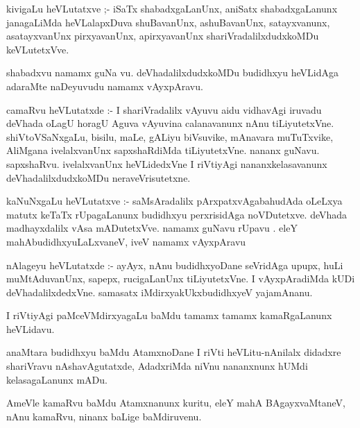 \documentclass{article}
\begin{document}
\begin{mn}
kivigaLu heVLutatxve ;- iSaTx shabadxgaLanUnx, aniSatx shabadxgaLanunx 
janagaLiMda heVLalapxDuva shuBavanUnx, ashuBavanUnx, satayxvanunx, asatayxvanUnx   
pirxyavanUnx, apirxyavanUnx   shariVradalilxdudxkoMDu keVLutetxVve.
\end{mn}

\begin{mn}
shabadxvu namamx guNa vu.  deVhadalilxdudxkoMDu budidhxyu heVLidAga adaraMte 
naDeyuvudu namamx vAyxpAravu. 
\end{mn}

\begin{mn}
camaRvu heVLutatxde :- I shariVradalilx vAyuvu aidu vidhavAgi iruvadu deVhada
 oLagU horagU  Aguva vAyuvina calanavanunx nAnu tiLiyutetxVne.  shiVtoVSaNxgaLu, 
 bisilu, maLe, gALiyu biVsuvike, mAnavara muTuTxvike, AliMgana ivelalxvanUnx 
 sapxshaRdiMda tiLiyutetxVne. nananx guNavu. sapxshaRvu. ivelalxvanUnx heVLidedxVne
 I riVtiyAgi nananxkelasavanunx deVhadalilxdudxkoMDu neraveVrisutetxne. 
\end{mn}

\begin{mn}
kaNuNxgaLu heVLutatxve :- saMsAradalilx pArxpatxvAgabahudAda oLeLxya   matutx 
keTaTx rUpagaLanunx  budidhxyu perxrisidAga noVDutetxve. deVhada madhayxdalilx 
vAsa mADutetxVve.  namamx guNavu rUpavu . eleY mahAbudidhxyuLaLxvaneV, iveV 
namamx vAyxpAravu 
\end{mn}

\begin{mn}
nAlageyu heVLutatxde :- ayAyx, nAnu budidhxyoDane seVridAga  upupx, huLi
 muMtAduvanUnx,  sapepx, rucigaLanUnx tiLiyutetxVne. I vAyxpAradiMda kUDi
  deVhadalilxdedxVne. samasatx iMdirxyakUkxbudidhxyeV yajamAnanu.
\end{mn}

\begin{mn}
I riVtiyAgi paMceVMdirxyagaLu baMdu tamamx tamamx kamaRgaLanunx heVLidavu. 
\end{mn}

\begin{mn}
anaMtara budidhxyu baMdu AtamxnoDane I riVti heVLitu-nAnilalx didadxre
shariVravu nAshavAgutatxde, AdadxriMda niVnu nananxnunx hUMdi kelasagaLanunx mADu.
\end{mn}

\begin{mn}
AmeVle kamaRvu baMdu Atamxnanunx kuritu, eleY mahA BAgayxvaMtaneV, nAnu 
kamaRvu, ninanx baLige baMdiruvenu. 
\end{mn}
\end{document}
